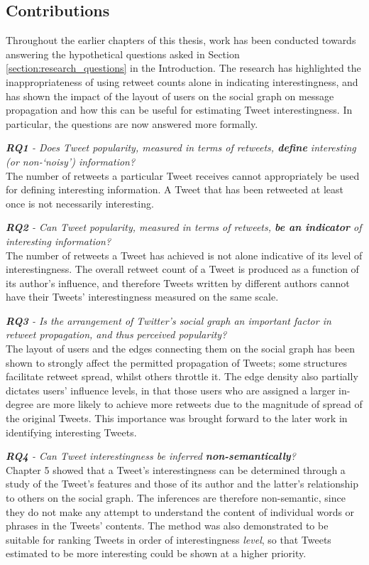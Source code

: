 \subsection{Contributions}
Throughout the earlier chapters of this thesis, work has been conducted towards answering the hypothetical questions asked in Section \ref{section:research_questions} in the Introduction. The research has highlighted the inappropriateness of using retweet counts alone in indicating interestingness, and has shown the impact of the layout of users on the social graph on message propagation and how this can be useful for estimating Tweet interestingness. In particular, the questions are now answered more formally.

\textit{\textbf{RQ1} - Does Tweet popularity, measured in terms of retweets, \textbf{define} interesting (or non-`noisy') information?}\\
The number of retweets a particular Tweet receives cannot appropriately be used for defining interesting information. A Tweet that has been retweeted at least once is not necessarily interesting.

\textit{\textbf{RQ2} - Can Tweet popularity, measured in terms of retweets, \textbf{be an indicator} of interesting information?}\\
The number of retweets a Tweet has achieved is not alone indicative of its level of interestingness. The overall retweet count of a Tweet is produced as a function of its author's influence, and therefore Tweets written by different authors cannot have their Tweets' interestingness measured on the same scale.

\textit{\textbf{RQ3} - Is the arrangement of Twitter's social graph an important factor in retweet propagation, and thus perceived popularity?}\\
The layout of users and the edges connecting them on the social graph has been shown to strongly affect the permitted propagation of Tweets; some structures facilitate retweet spread, whilst others throttle it. The edge density also partially dictates users' influence levels, in that those users who are assigned a larger in-degree are more likely to achieve more retweets due to the magnitude of spread of the original Tweets. This importance was brought forward to the later work in identifying interesting Tweets.

\textit{\textbf{RQ4} - Can Tweet interestingness be inferred \textbf{non-semantically}?}\\
Chapter 5 showed that a Tweet's interestingness can be determined through a study of the Tweet's features and those of its author and the latter's relationship to others on the social graph. The inferences are therefore non-semantic, since they do not make any attempt to understand the content of individual words or phrases in the Tweets' contents. The method was also demonstrated to be suitable for ranking Tweets in order of interestingness \textit{level}, so that Tweets estimated to be more interesting could be shown at a higher priority.

